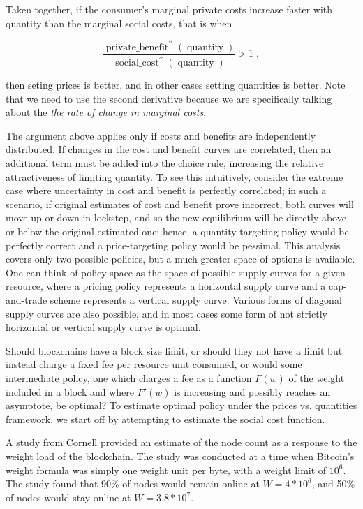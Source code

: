 \documentclass[12pt, final]{article}
\newcommand{\fname}[1]{ \operatorname{ #1 } }
\newcommand{\opname}[1]{ \operatorname{ #1 } }
\begin{document}
Taken together, if the consumer's marginal private costs increase faster with quantity than the marginal social costs, that is when

\begin{equation}
\frac{ \fname{private\_benefit}^{\prime \prime}( \opname{quantity} ) }{ \fname{social\_cost}^{\prime \prime}( \opname{quantity}) }  > 1 \; ,
\end{equation}

then seting prices is better, and in other cases setting quantities is better.  Note that we need to use the second derivative because we are specifically talking about the \emph{the rate of change in marginal costs}.

The argument above applies only if costs and benefits are independently distributed. If changes in the cost and benefit curves are correlated, then an additional term must be added into the choice rule, increasing the relative attractiveness of limiting quantity. To see this intuitively, consider the extreme case where uncertainty in cost and benefit is perfectly correlated; in such a scenario, if original estimates of cost and benefit prove incorrect, both curves will move up or down in lockstep, and so the new equilibrium will be directly above or below the original estimated one; hence, a quantity-targeting policy would be perfectly correct and a price-targeting policy would be pessimal. This analysis covers only two possible policies, but a much greater space of options is available.  One can think of policy space as the space of possible supply curves for a given resource, where a pricing policy represents a horizontal supply curve and a cap-and-trade scheme represents a vertical supply curve. Various forms of diagonal supply curves are also possible, and in most cases some form of not strictly horizontal or vertical supply curve is optimal.

Should blockchains have a block size limit, or should they not have a limit but instead charge a fixed fee per resource unit consumed, or would some intermediate policy, one which charges a fee as a function $F(w)$ of the weight included in a block and where $F'(w)$ is increasing and possibly reaches an asymptote, be optimal? To estimate optimal policy under the prices vs. quantities framework, we start off by attempting to estimate the social cost function.

A study from Cornell\cite{cornell} provided an estimate of the node count as a response to the weight load of the blockchain. The study was conducted at a time when Bitcoin's weight formula was simply one weight unit per byte, with a weight limit of $10^6$. The study found that 90\% of nodes would remain online at $W = 4*10^6$, and 50\% of nodes would stay online at $W = 3.8 * 10^7$.
\end{document}

